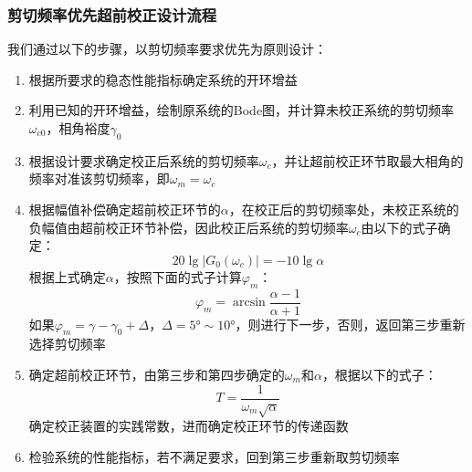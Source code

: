 \subsubsection{剪切频率优先超前校正设计流程}
我们通过以下的步骤，以剪切频率要求优先为原则设计：
\begin{enumerate}
    \item 根据所要求的稳态性能指标确定系统的开环增益
    \item 利用已知的开环增益，绘制原系统的Bode图，并计算未校正系统的剪切频率$\omega_{c0}$，相角裕度$\gamma_0$
    \item 根据设计要求确定校正后系统的剪切频率$\omega_c$，并让超前校正环节取最大相角的频率对准该剪切频率，即$\omega_m = \omega_c$
    \item 根据幅值补偿确定超前校正环节的$\alpha$，在校正后的剪切频率处，未校正系统的负幅值由超前校正环节补偿，因此校正后系统的剪切频率$\omega_c$由以下的式子确定：
    \begin{equation*}
        20 \lg \left\lvert G_0(\omega_c) \right\rvert = -10 \lg \alpha
    \end{equation*}
    根据上式确定$\alpha$，按照下面的式子计算$\varphi_m$：
    \begin{equation*}
        \varphi_m = \arcsin \frac{\alpha - 1}{\alpha + 1} 
    \end{equation*}
    如果$\varphi_m = \gamma - \gamma_0 + \Delta$，$\Delta = 5\text{°} \sim  10 \text{°}$，则进行下一步，否则，返回第三步重新选择剪切频率
    \item 确定超前校正环节，由第三步和第四步确定的$\omega_m$和$\alpha$，根据以下的式子：
    \begin{equation*}
        T = \frac{1}{\omega_m \sqrt{\alpha}}
    \end{equation*}
    确定校正装置的实践常数，进而确定校正环节的传递函数
    \item 检验系统的性能指标，若不满足要求，回到第三步重新取剪切频率
\end{enumerate}

